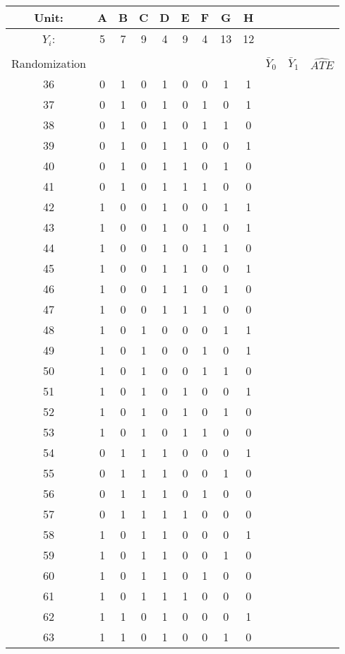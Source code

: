 \documentclass[a4paper,12pt]{article}
\begin{document}
\begin{center}
\begin{longtable}{c|cccccccc|rrr}
Unit: & A & B & C & D & E & F & G & H & && \\ \midrule
$Y_i$: & 5 & 7 & 9 & 4 & 9 & 4 & 13 & 12 &  &  \\
  &&&&&&&&&&& \\ \midrule
Randomization & &&&&&&&& $\bar{Y}_0$ & $\bar{Y}_1$ & $\widehat{ATE}$ \\ \midrule
36 & 0 & 1 & 0 & 1 & 0 & 0 & 1 & 1 & \\
37 & 0 & 1 & 0 & 1 & 0 & 1 & 0 & 1 & \\
38 & 0 & 1 & 0 & 1 & 0 & 1 & 1 & 0 & \\
39 & 0 & 1 & 0 & 1 & 1 & 0 & 0 & 1 & \\
40 & 0 & 1 & 0 & 1 & 1 & 0 & 1 & 0 & \\ \midrule
41 & 0 & 1 & 0 & 1 & 1 & 1 & 0 & 0 & \\
42 & 1 & 0 & 0 & 1 & 0 & 0 & 1 & 1 & \\
43 & 1 & 0 & 0 & 1 & 0 & 1 & 0 & 1 & \\
44 & 1 & 0 & 0 & 1 & 0 & 1 & 1 & 0 & \\
45 & 1 & 0 & 0 & 1 & 1 & 0 & 0 & 1 & \\ \midrule
46 & 1 & 0 & 0 & 1 & 1 & 0 & 1 & 0 & \\
47 & 1 & 0 & 0 & 1 & 1 & 1 & 0 & 0 & \\
48 & 1 & 0 & 1 & 0 & 0 & 0 & 1 & 1 & \\
49 & 1 & 0 & 1 & 0 & 0 & 1 & 0 & 1 & \\
50 & 1 & 0 & 1 & 0 & 0 & 1 & 1 & 0 & \\ \midrule
51 & 1 & 0 & 1 & 0 & 1 & 0 & 0 & 1 & \\
52 & 1 & 0 & 1 & 0 & 1 & 0 & 1 & 0 & \\
53 & 1 & 0 & 1 & 0 & 1 & 1 & 0 & 0 & \\
54 & 0 & 1 & 1 & 1 & 0 & 0 & 0 & 1 & \\
55 & 0 & 1 & 1 & 1 & 0 & 0 & 1 & 0 & \\ \midrule
56 & 0 & 1 & 1 & 1 & 0 & 1 & 0 & 0 & \\
57 & 0 & 1 & 1 & 1 & 1 & 0 & 0 & 0 & \\
58 & 1 & 0 & 1 & 1 & 0 & 0 & 0 & 1 & \\
59 & 1 & 0 & 1 & 1 & 0 & 0 & 1 & 0 & \\
60 & 1 & 0 & 1 & 1 & 0 & 1 & 0 & 0 & \\ \midrule
61 & 1 & 0 & 1 & 1 & 1 & 0 & 0 & 0 & \\
62 & 1 & 1 & 0 & 1 & 0 & 0 & 0 & 1 & \\
63 & 1 & 1 & 0 & 1 & 0 & 0 & 1 & 0 & \\

\end{longtable}
\end{center}
\end{document}

